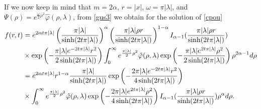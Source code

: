 \documentclass[11pt,a4paper]{amsart}
\def \vf{\varphi}
\newcommand{\la}{\lambda}
\numberwithin{equation}{section}
\numberwithin{equation}{section}
\begin{document}
If we now keep in mind that $m=2\alpha$, $r = |x|$, $\omega = \pi |\la|$, and $\Psi(\rho) = e^{\frac{\omega}{2} \rho^2} \hat \vf(\rho,\la)$, from \eqref{gus3} we obtain  for the solution of \eqref{cpou}
\begin{align}\label{gus4}
f(r,t) & =  e^{2\alpha t \pi |\la|} \left(\frac{\pi |\la|}{\sinh(2t \pi |\la|)}\right)^{\alpha} \left(\frac{\pi |\la| \rho r}{\sinh(2t\pi |\la|)}\right)^{1-\alpha} I_{\alpha - 1}(\frac{\pi |\la| \rho r}{\sinh(2t\pi |\la|)})
\\
& \times \exp\left(- \frac{\pi |\la| e^{-2 t \pi |\la|} r^2}{2 \sinh(2t\pi |\la|)}\right) \int_0^\infty e^{\frac{\pi |\la|}{2} \rho^2} \hat \vf(\rho,\la) \exp\left(- \frac{\pi |\la| e^{2t\pi |\la|} \rho^2}{2 \sinh(2t\pi |\la|)}\right)
  \rho^{2\alpha-1} d\rho
\notag\\
& =  e^{2\alpha t \pi |\la|}r^{1-\alpha} \frac{\pi |\la|}{\sinh(2t \pi |\la|)}   \exp\left(- \frac{2\pi |\la| e^{-2 t \pi |\la|} r^2}{4 \sinh(2t\pi |\la|)}\right) 
\notag
\\
& \times \int_0^\infty e^{\frac{\pi |\la|}{2} \rho^2} \hat \vf(\rho,\la) \exp\left(- \frac{2\pi |\la| e^{2t\pi |\la|} \rho^2}{4 \sinh(2t\pi |\la|)}\right) I_{\alpha - 1}(\frac{\pi |\la|\rho r}{\sinh(2t\pi |\la|)})
  \rho^{\alpha} d\rho.
\notag
\end{align}
\end{document}
